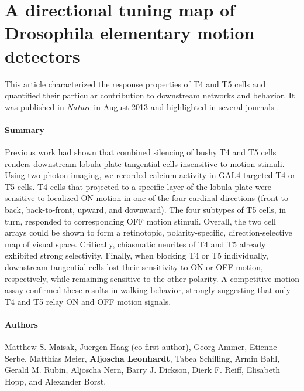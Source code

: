 \section{A directional tuning map of Drosophila elementary motion detectors}
\label{sct:manuscript_maisak}

This article characterized the response properties of T4 and T5 cells and quantified their particular contribution to downstream networks and behavior. It was published in \textit{Nature} in August 2013 \citep{Maisak:2013kk} and highlighted in several journals \citep{Masland:2013kv,Gilbert:2013aa,Yonehara:2013aa,Flight:2013aa}.

\paragraph{Summary}
Previous work had shown that combined silencing of bushy T4 and T5 cells renders downstream lobula plate tangential cells insensitive to motion stimuli. Using two-photon imaging, we recorded calcium activity in GAL4-targeted T4 or T5 cells. T4 cells that projected to a specific layer of the lobula plate were sensitive to localized ON motion in one of the four cardinal directions (front-to-back, back-to-front, upward, and downward). The four subtypes of T5 cells, in turn, responded to corresponding OFF motion stimuli. Overall, the two cell arrays could be shown to form a retinotopic, polarity-specific, direction-selective map of visual space. Critically, chiasmatic neurites of T4 and T5 already exhibited strong selectivity. Finally, when blocking T4 or T5 individually, downstream tangential cells lost their sensitivity to ON or OFF motion, respectively, while remaining sensitive to the other polarity. A competitive motion assay confirmed these results in walking behavior, strongly suggesting that only T4 and T5 relay ON and OFF motion signals.

\paragraph{Authors}
Matthew S. Maisak, Juergen Haag (co-first author), Georg Ammer, Etienne Serbe, Matthias Meier, \textbf{Aljoscha Leonhardt}, Tabea Schilling, Armin Bahl, Gerald M. Rubin, Aljoscha Nern, Barry J. Dickson, Dierk F. Reiff, Elisabeth Hopp, and Alexander Borst.

